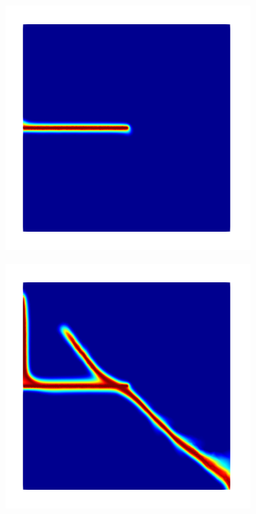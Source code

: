 \begin{figure}[htb!]
\begin{subfigure}[b]{0.21\textwidth}
    \end{subfigure}
    \begin{subfigure}[b]{0.21\textwidth}
        \centering
        \includegraphics[width=\textwidth,scale=0.5]{past/figures/mode2_intact_plate_spectral_intermediate.png}
    \end{subfigure}
    \begin{subfigure}[b]{0.21\textwidth}
        \centering
        \includegraphics[width=\textwidth,scale=0.5]{past/figures/mode2_intact_plate_spectral_final.png}

\end{subfigure}
\end{figure}
